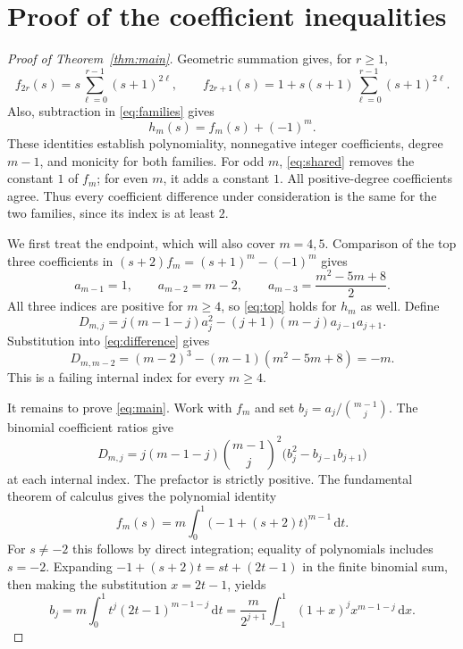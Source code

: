 \documentclass[11pt]{article}
\newcommand{\dd}{\,\mathrm{d}}
\begin{document}
\section{Proof of the coefficient inequalities}

\begin{proof}[Proof of Theorem~\ref{thm:main}]
Geometric summation gives, for $r\ge1$,
\begin{equation}\label{eq:positive-coefficients}
 f_{2r}(s)=s\sum_{\ell=0}^{r-1}(s+1)^{2\ell},\qquad
 f_{2r+1}(s)=1+s(s+1)\sum_{\ell=0}^{r-1}(s+1)^{2\ell}.
\end{equation}
Also, subtraction in \eqref{eq:families} gives
\begin{equation}\label{eq:shared}
 h_m(s)=f_m(s)+(-1)^m.
\end{equation}
These identities establish polynomiality, nonnegative integer
coefficients, degree $m-1$, and monicity for both families. For odd $m$,
\eqref{eq:shared} removes the constant $1$ of $f_m$; for even $m$,
it adds a constant $1$. All positive-degree coefficients agree.
Thus every coefficient difference under consideration is the same for
the two families, since its index is at least $2$.

We first treat the endpoint, which will also cover $m=4,5$.
Comparison of the top three coefficients in
$(s+2)f_m=(s+1)^m-(-1)^m$ gives
\begin{equation}\label{eq:top}
 a_{m-1}=1,\qquad a_{m-2}=m-2,\qquad
 a_{m-3}=\frac{m^2-5m+8}{2}.
\end{equation}
All three indices are positive for $m\ge4$, so \eqref{eq:top} holds
for $h_m$ as well. Define
\begin{equation}\label{eq:difference}
 D_{m,j}=j(m-1-j)a_j^2-(j+1)(m-j)a_{j-1}a_{j+1}.
\end{equation}
Substitution into \eqref{eq:difference} gives
\begin{equation}\label{eq:endpoint}
 D_{m,m-2}=(m-2)^3-(m-1)(m^2-5m+8)=-m.
\end{equation}
This is a failing internal index for every $m\ge4$.

It remains to prove \eqref{eq:main}. Work with $f_m$ and set
$b_j=a_j/\binom{m-1}{j}$. The binomial coefficient ratios give
\begin{equation}\label{eq:minor-normalized}
 D_{m,j}=j(m-1-j)\binom{m-1}{j}^{\!2}
 \bigl(b_j^2-b_{j-1}b_{j+1}\bigr)
\end{equation}
at each internal index. The prefactor is strictly positive.
The fundamental theorem of calculus gives the polynomial identity
\begin{equation}\label{eq:polynomial-integral}
 f_m(s)=m\int_0^1\bigl(-1+(s+2)t\bigr)^{m-1}\dd t.
\end{equation}
For $s\ne-2$ this follows by direct integration; equality of
polynomials includes $s=-2$. Expanding
$-1+(s+2)t=st+(2t-1)$ in the finite binomial sum, then making the
substitution $x=2t-1$, yields
\begin{equation}\label{eq:coefficient-integral}
 b_j=m\int_0^1t^j(2t-1)^{m-1-j}\dd t
 =\frac{m}{2^{j+1}}\int_{-1}^1(1+x)^jx^{m-1-j}\dd x.
\end{equation}


\end{proof}
\end{document}
